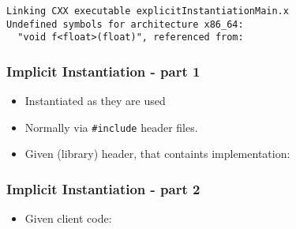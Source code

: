 \begin{verbatim}
Linking CXX executable explicitInstantiationMain.x
Undefined symbols for architecture x86_64:
  "void f<float>(float)", referenced from:
\end{verbatim}

\subsubsection{Implicit Instantiation - part
1}\label{implicit-instantiation---part-1}

\begin{itemize}
\item
  Instantiated as they are used
\item
  Normally via \texttt{\#include} header files.
\item
  Given (library) header, that containts implementation:
\end{itemize}

\begin{Shaded}
\begin{Highlighting}[]
 \NormalTok{<}   \NormalTok{; \}}
\end{Highlighting}
\end{Shaded}

\subsubsection{Implicit Instantiation - part
2}\label{implicit-instantiation---part-2}

\begin{itemize}
\itemsep1pt\parskip0pt
\item
  Given client code:
\end{itemize}

\begin{Shaded}
\begin{Highlighting}[]

  
\NormalTok{\{}
   
  \NormalTok{);}
   
   
  \NormalTok{);}
   
  \NormalTok{>(}\NormalTok{<}\NormalTok{>(}\NormalTok{));  }
\NormalTok{\}}
\end{Highlighting}
\end{Shaded}

